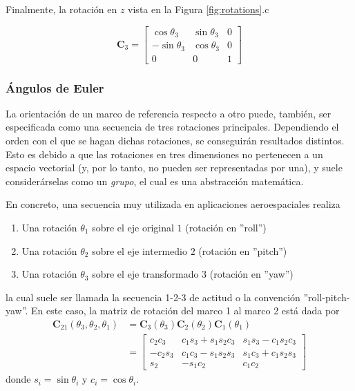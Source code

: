 Finalmente, la rotación en $z$ vista en la Figura \ref{fig:rotations}.c

\begin{equation}
    \bm{C}_3 = 
    \begin{bmatrix}
        \cos \theta_3 & \sin \theta_3 & 0 \\
        -\sin \theta_3 & \cos \theta_3 & 0 \\
        0 & 0 & 1
    \end{bmatrix}
\end{equation}


\subsubsection{Ángulos de Euler}
La orientación de un marco de referencia respecto a otro puede, también, ser especificada como una secuencia de tres rotaciones principales. Dependiendo el orden con el que se hagan dichas rotaciones, se conseguirán resultados distintos. Esto es debido a que las rotaciones en tres dimensiones no pertenecen a un espacio vectorial (y, por lo tanto, no pueden ser representadas por una), y suele considerárselas como un \textit{grupo}, el cual es una abstracción matemática. %

En concreto, una secuencia muy utilizada en aplicaciones aeroespaciales realiza
\begin{enumerate}
    \item Una rotación $\theta_1$ sobre el eje original $1$ (rotación en ''roll'')
    \item Una rotación $\theta_2$ sobre el eje intermedio $2$ (rotación en ''pitch'')
    \item Una rotación $\theta_3$ sobre el eje transformado $3$ (rotación en ''yaw'')
\end{enumerate}
la cual suele ser llamada la secuencia 1-2-3 de actitud o la convención ''roll-pitch-yaw''. En este caso, la matriz de rotación del marco 1 al marco 2 está dada por
\begin{align}
    \bm{C}_{21}(\theta_3,\theta_2,\theta_1) &= \bm{C}_3(\theta_3)\bm{C}_2(\theta_2)\bm{C}_1(\theta_1) \\
    &=
    \begin{bmatrix}
        c_2c_3 & c_1s_3+s_1s_2c_3 & s_1s_3 - c_1s_2c_3 \\
        -c_2s_3 & c_1c_3 - s_1s_2s_3 & s_1c_3 + c_1s_2s_3 \\
        s_2 & -s_1c_2 & c_1c_2
    \end{bmatrix}
    \label{eq:rpyrotation}
\end{align}
donde $s_i = \sin{\theta_i}$ y $c_i = \cos{\theta_i}$.

